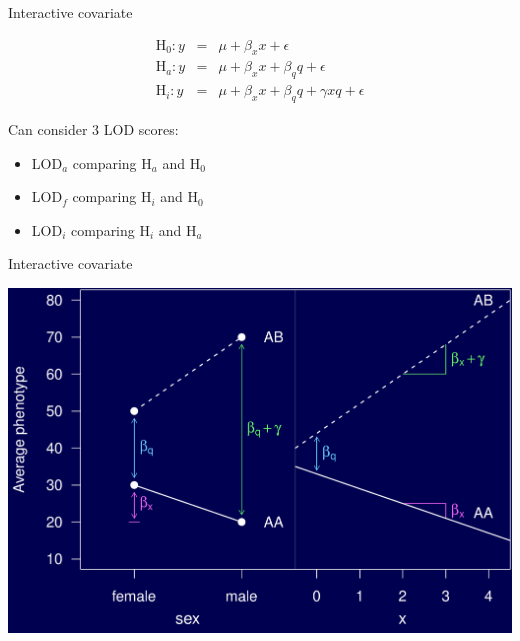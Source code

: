 \documentclass[12pt]{article}
\newcommand{\headsize}{\fontsize{35}{35} \selectfont}
\newcommand{\smallsize}{\fontsize{25}{30} \selectfont}
\begin{document}
\newpage

\headsize \color{myyellow}
\hfill \begin{minipage}{5.75in}
\centering
Interactive covariate
\end{minipage}

\vspace{15mm}

\color{mywhite} \smallsize

\begin{eqnarray*}
\text{H}_0: y & = & \mu + \beta_x x + \epsilon \\
\text{H}_a: y & = & \mu + \beta_x x + \beta_q q + \epsilon \\
\text{H}_i: y & = & \mu + \beta_x x + \beta_q q + \gamma x q + \epsilon
\end{eqnarray*}

\vspace{15mm}

\hspace{0.5in}
\begin{minipage}{9.5in}
Can consider 3 LOD scores:
  \begin{itemize}
    \item LOD$_a$ comparing H$_a$ and H$_0$
    \item LOD$_f$ comparing H$_i$ and H$_0$
    \item LOD$_i$ comparing H$_i$ and H$_a$
  \end{itemize}
\end{minipage}

\newpage

\headsize \color{myyellow}
\hfill \begin{minipage}{5.75in}
\centering
Interactive covariate
\end{minipage}

\vfill

\centerline{\includegraphics{FigsA/intcovar.pdf}}
\end{document}

